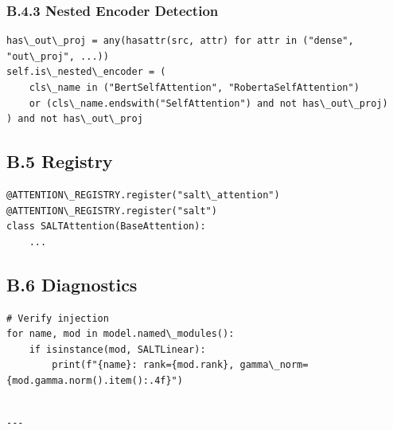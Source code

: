 \subsubsection{B.4.3 Nested Encoder Detection}

\begin{lstlisting}
has\_out\_proj = any(hasattr(src, attr) for attr in ("dense", "out\_proj", ...))
self.is\_nested\_encoder = (
    cls\_name in ("BertSelfAttention", "RobertaSelfAttention")
    or (cls\_name.endswith("SelfAttention") and not has\_out\_proj)
) and not has\_out\_proj
\end{lstlisting}

\subsection{B.5 Registry}

\begin{lstlisting}
@ATTENTION\_REGISTRY.register("salt\_attention")
@ATTENTION\_REGISTRY.register("salt")
class SALTAttention(BaseAttention):
    ...
\end{lstlisting}

\subsection{B.6 Diagnostics}

\begin{lstlisting}
# Verify injection
for name, mod in model.named\_modules():
    if isinstance(mod, SALTLinear):
        print(f"{name}: rank={mod.rank}, gamma\_norm={mod.gamma.norm().item():.4f}")
\end{lstlisting}
\begin{lstlisting}

---
\end{lstlisting}
